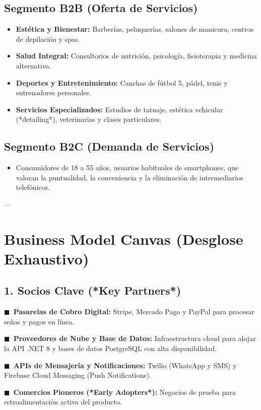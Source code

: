\documentclass[11pt,a4paper]{article}
\newcommand{\bulletBlue}{\textcolor{primaryBlue}{\footnotesize$\blacksquare$}\ }
\newcommand{\destacado}[2]{\noindent\bulletBlue\textbf{#1:} #2\par\vspace{3pt}}
\begin{document}
\subsection{Segmento B2B (Oferta de Servicios)}
\begin{itemize}
    \item \textbf{Estética y Bienestar:} Barberías, peluquerías, salones de manicura, centros de depilación y spas.
    \item \textbf{Salud Integral:} Consultorios de nutrición, psicología, fisioterapia y medicina alternativa.
    \item \textbf{Deportes y Entretenimiento:} Canchas de fútbol 5, pádel, tenis y entrenadores personales.
    \item \textbf{Servicios Especializados:} Estudios de tatuaje, estética vehicular (*detailing*), veterinarias y clases particulares.
\end{itemize}

\subsection{Segmento B2C (Demanda de Servicios)}
\begin{itemize}
    \item Consumidores de 18 a 55 años, usuarios habituales de smartphones, que valoran la puntualidad, la conveniencia y la eliminación de intermediarios telefónicos.
\end{itemize}

---

\section{Business Model Canvas (Desglose Exhaustivo)}

\subsection{1. Socios Clave (*Key Partners*)}
\destacado{Pasarelas de Cobro Digital}{Stripe, Mercado Pago y PayPal para procesar señas y pagos en línea.}
\destacado{Proveedores de Nube y Base de Datos}{Infraestructura cloud para alojar la API .NET 8 y bases de datos PostgreSQL con alta disponibilidad.}
\destacado{APIs de Mensajería y Notificaciones}{Twilio (WhatsApp y SMS) y Firebase Cloud Messaging (Push Notifications).}
\destacado{Comercios Pioneros (*Early Adopters*)}{Negocios de prueba para retroalimentación activa del producto.}
\end{document}
